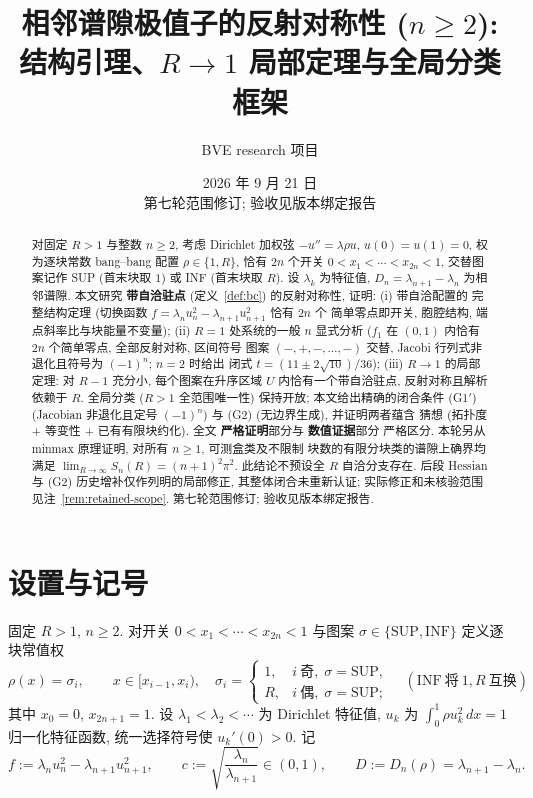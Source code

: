 \documentclass[UTF8]{ctexart}
\title{相邻谱隙极值子的反射对称性 ($n\ge2$):\\ 结构引理、$R\to1$ 局部定理与全局分类框架}
\author{BVE research 项目}
\date{2026 年 9 月 21 日\\第七轮范围修订; 验收见版本绑定报告}
\newcommand{\STRICT}{\textbf{严格证明}}
\newcommand{\EVIDENCE}{\textbf{数值证据}}
\begin{document}
\maketitle

\begin{abstract}
对固定 $R>1$ 与整数 $n\ge2$, 考虑 Dirichlet 加权弦 $-u''=\lambda\rho u$,
$u(0)=u(1)=0$, 权为逐块常数 bang--bang 配置 $\rho\in\{1,R\}$, 恰有 $2n$ 个开关
$0<x_1<\cdots<x_{2n}<1$, 交替图案记作 SUP (首末块取 $1$) 或 INF (首末块取 $R$).
设 $\lambda_k$ 为特征值, $D_n=\lambda_{n+1}-\lambda_n$ 为相邻谱隙. 本文研究
\textbf{带自洽驻点} (定义~\ref{def:bc}) 的反射对称性, 证明: (i) 带自洽配置的
完整结构定理 (切换函数 $f=\lambda_nu_n^2-\lambda_{n+1}u_{n+1}^2$ 恰有 $2n$ 个
简单零点即开关, 胞腔结构, 端点斜率比与块能量不变量); (ii) $R=1$ 处系统的一般
$n$ 显式分析 ($f_1$ 在 $(0,1)$ 内恰有 $2n$ 个简单零点, 全部反射对称, 区间符号
图案 $(-,+,-,\dots,-)$ 交替, Jacobi 行列式非退化且符号为 $(-1)^n$; $n=2$ 时给出
闭式 $t=(11\pm2\sqrt{10})/36$); (iii) $R\to1$ 的局部定理: 对 $R-1$ 充分小,
每个图案在升序区域 $U$ 内恰有一个带自洽驻点, 反射对称且解析依赖于 $R$.
全局分类 ($R>1$ 全范围唯一性) 保持开放; 本文给出精确的闭合条件
(G1$'$) (Jacobian 非退化且定号 $(-1)^n$) 与 (G2) (无边界生成), 并证明两者蕴含
猜想 (拓扑度 + 等变性 + 已有有限块约化). 全文 \STRICT 部分与 \EVIDENCE 部分
严格区分. 本轮另从 minmax 原理证明, 对所有 $n\ge1$, 可测盒类及不限制
块数的有限分块类的谱隙上确界均满足
$\lim_{R\to\infty}S_n(R)=(n+1)^2\pi^2$. 此结论不预设全 $R$ 自洽分支存在.
后段 Hessian 与 (G2) 历史增补仅作列明的局部修正, 其整体闭合未重新认证;
实际修正和未核验范围见注~\ref{rem:retained-scope}.
第七轮范围修订; 验收见版本绑定报告.
\end{abstract}

\section{设置与记号}\label{sec:setup}

固定 $R>1$, $n\ge2$. 对开关 $0<x_1<\cdots<x_{2n}<1$ 与图案
$\sigma\in\{\mathrm{SUP},\mathrm{INF}\}$ 定义逐块常值权
\begin{equation*}
	\rho(x)=\sigma_i,\qquad x\in[x_{i-1},x_i),\quad
	\sigma_i=\begin{cases}1,& i\ \text{奇},\; \sigma=\mathrm{SUP},\\
	R,& i\ \text{偶},\; \sigma=\mathrm{SUP};\end{cases}
	\quad
	(\mathrm{INF}\ \text{将}\ 1,R\ \text{互换})
\end{equation*}
其中 $x_0=0$, $x_{2n+1}=1$. 设 $\lambda_1<\lambda_2<\cdots$ 为 Dirichlet 特征值,
$u_k$ 为 $\int_0^1\rho u_k^2\,dx=1$ 归一化特征函数, 统一选择符号使
$u_k'(0)>0$. 记
\begin{equation*}
	f:=\lambda_n u_n^2-\lambda_{n+1}u_{n+1}^2,\qquad
	c:=\sqrt{\frac{\lambda_n}{\lambda_{n+1}}}\in(0,1),\qquad
	D:=D_n(\rho)=\lambda_{n+1}-\lambda_n.
\end{equation*}
\end{document}
